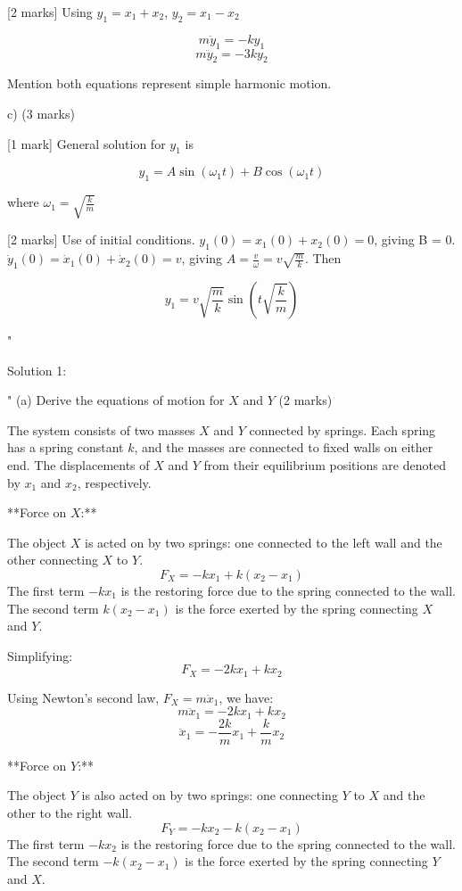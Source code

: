 [2 marks] Using \( y_{1} = x_{1} + x_{2} \), \( y_{2} = x_{1} - x_{2} \)

\[ m \ddot{y}_1 = -k y_1 \]
\[ m \ddot{y}_2 = -3k y_2 \]

Mention both equations represent simple harmonic motion.

c) (3 marks)

 [1 mark] General solution for \( y_1 \) is 

\[ y_1 = A \sin(\omega_1 t) + B \cos(\omega_1 t) \]

where \(\omega_1 = \sqrt{\frac{k}{m}}\)

[2 marks] Use of initial conditions. \( y_1(0) = x_1(0) + x_2(0) = 0 \), giving B = 0. \( \dot{y}_1(0) = \dot{x}_1(0) + \dot{x}_2(0) = v \), giving \( A = \frac{v}{\omega} = v\sqrt{\frac{m}{k}} \). Then 

\[ y_1 = v\sqrt{\frac{m}{k}} \sin \left ( t \sqrt{\frac{k}{m}} \right ) \]

"

Solution 1: 

"
(a) Derive the equations of motion for $X$ and $Y$ (2 marks)

The system consists of two masses $X$ and $Y$ connected by springs. Each spring has a spring constant $k$, and the masses are connected to fixed walls on either end. The displacements of $X$ and $Y$ from their equilibrium positions are denoted by $x_1$ and $x_2$, respectively.

**Force on $X$:**

The object $X$ is acted on by two springs: one connected to the left wall and the other connecting $X$ to $Y$.
\[
F_X = -k x_1 + k (x_2 - x_1)
\]
The first term $-k x_1$ is the restoring force due to the spring connected to the wall. The second term $k (x_2 - x_1)$ is the force exerted by the spring connecting $X$ and $Y$.

Simplifying:
\[
F_X = -2k x_1 + k x_2
\]

Using Newton's second law, $F_X = m \ddot{x}_1$, we have:
\[
m \ddot{x}_1 = -2k x_1 + k x_2
\]
\[
\ddot{x}_1 = -\frac{2k}{m} x_1 + \frac{k}{m} x_2
\]

**Force on $Y$:**

The object $Y$ is also acted on by two springs: one connecting $Y$ to $X$ and the other to the right wall.
\[
F_Y = -k x_2 - k (x_2 - x_1)
\]
The first term $-k x_2$ is the restoring force due to the spring connected to the wall. The second term $-k (x_2 - x_1)$ is the force exerted by the spring connecting $Y$ and $X$.

